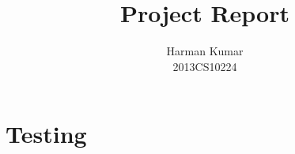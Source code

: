 \documentclass[]{article}
\begin{document}
\author{
		Harman Kumar\\
		2013CS10224		
		}

\title{Project Report}
\maketitle

\section{Testing}
\end{document}
